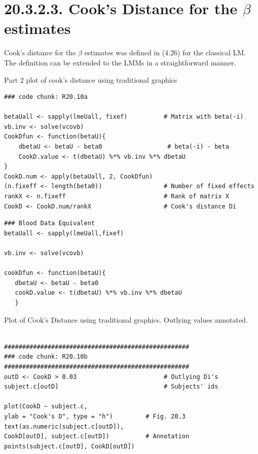 \documentclass[a4paper,12pt]{article}
\begin{document}
\section{20.3.2.3. Cook's Distance for the $\beta$ estimates}

Cook's distance for the $\beta$ estimates was defined in (4.26) for the classical LM.
The definition can be extended to the LMMs in a straightforward manner.


Part 2 plot of cook's distance using traditional graphics


\begin{framed}
	\begin{verbatim}
### code chunk: R20.10a

betaUall <- sapply(lmeUall, fixef)          # Matrix with beta(-i)
vb.inv <- solve(vcovb)                       
CookDfun <- function(betaU){  
	dbetaU <- betaU - beta0                  # beta(-i) - beta
	CookD.value <- t(dbetaU) %*% vb.inv %*% dbetaU 
}
CookD.num <- apply(betaUall, 2, CookDfun)
(n.fixeff <- length(beta0))                 # Number of fixed effects
rankX <- n.fixeff                           # Rank of matrix X
CookD <- CookD.num/rankX                    # Cook's distance Di
\end{verbatim}
\end{framed}
\begin{framed}
\begin{verbatim}
### Blood Data Equivalent
betaUall <- sapply(lmeUall,fixef)

vb.inv <- solve(vcovb)

cookDfun <- function(betaU){
   dbetaU <- betaU - beta0
   cookD.value <- t(dbetaU) %*% vb.inv %*% dbetaU
   }
\end{verbatim}
\end{framed}

Plot of Cook's Distance using traditional graphics. 
Outlying values annotated.

\begin{framed}
\begin{verbatim}

###################################################
### code chunk: R20.10b
###################################################
outD <- CookD > 0.03                        # Outlying Di's
subject.c[outD]                             # Subjects' ids 

plot(CookD ~ subject.c, 
ylab = "Cook's D", type = "h")         # Fig. 20.3
text(as.numeric(subject.c[outD]),
CookD[outD], subject.c[outD])          # Annotation 
points(subject.c[outD], CookD[outD])
\end{verbatim}
\end{framed}
\end{document}
